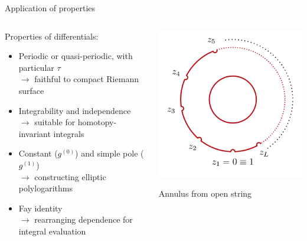 \documentclass[11pt,aspectratio=169]{beamer}
\begin{document}
\begin{frame}{Application of properties}
    \begin{columns}
        \begin{column}{0.5\textwidth}
            Properties of differentials:
            \begin{itemize}
                \item Periodic or quasi-periodic, with particular $\tau$ \\
                $\rightarrow$ faithful to compact Riemann surface
                \item Integrability and independence \\
                $\rightarrow$ suitable for homotopy-invariant integrals
                \item Constant ($g^{(0)}$) and simple pole ($g^{(1)}$) \\
                $\rightarrow$ constructing elliptic polylogarithms
                \item Fay identity \\
                $\rightarrow$ rearranging dependence for integral evaluation
            \end{itemize}
        \end{column}
        \begin{column}{0.45\textwidth}
            \center{}
            \includegraphics[width=0.7\columnwidth]{assets/Annulus.png}

            \tiny Annulus from open string

            \cite{Broedel_2022}
        \end{column}
    \end{columns}
\end{frame}
\end{document}
